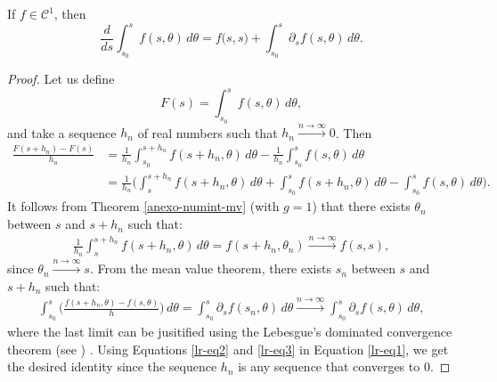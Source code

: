 \begin{thrm}
	\label{anexo-numint-lr}
   If $f \in \mathcal{C}^1$, then
	\begin{equation*}
	\frac{d}{ds}\int_{s_0}^{s}f(s,\theta) \,d\theta =
   f\big(s, s\big)+
	\int_{s_0}^{s}\partial_s f(s,\theta) \,d\theta.
	\end{equation*}
\end{thrm}
\begin{proof}
Let us define
\begin{equation*}
F(s) = \int_{s_0}^{s}f(s,\theta) \,d\theta,
\end{equation*}
and take a sequence $h_n$ of real numbers such that  \( h_n \overset{n \to \infty}{\longrightarrow} 0 \).
Then
\begin{align}
\frac{F(s+h_n)-F(s)}{h_n} &= 
\frac{1}{h_n} \int_{s_0}^{s+h_n}f(s+h_n,\theta) \,d\theta - 
\frac{1}{h_n} \int_{s_0}^{s}f(s,\theta) \,d\theta \\ \label{lr-eq1}
&= \frac{1}{h_n} \bigg(
 \int_{s}^{s+h_n}f(s+h_n,\theta) \,d\theta 
+\int_{s_0}^{s}f(s+h_n,\theta) \,d\theta 
-\int_{s_0}^{s}f(s,\theta) \,d\theta \bigg).
\end{align}
It follows from Theorem \ref{anexo-numint-mv} (with $g=1$) that there exists $\theta_n$ between $s$ and $s+h_n$ such that:
\begin{align}\label{lr-eq2}
\frac{1}{h_n} \int_{s}^{s+h_n}f(s+h_n,\theta) \,d\theta  =
f(s+h_n,\theta_n) \overset{n \to \infty}{\longrightarrow} f(s,s),
\end{align}
since \( \theta_n \overset{n \to \infty}{\longrightarrow} s \).
From the mean value theorem,  there exists $s_n$ between $s$ and $s+h_n$ such that:
\begin{align}\label{lr-eq3}
\int_{s_0}^{s} \bigg(\frac{f(s+h_n,\theta) -f(s,\theta)}{h}\bigg) \,d\theta =
\int_{s_0}^{s} \partial_s f(s_n,\theta) \,d\theta 
\overset{n \to \infty}{\longrightarrow}
\int_{s_0}^{s} \partial_s f(s,\theta) \,d\theta,
\end{align}
where the last limit can be jusitified using the Lebesgue's dominated convergence theorem (see \citet[\pno~54]{folland:1999}) .
Using Equations \eqref{lr-eq2} and \eqref{lr-eq3} in Equation \eqref{lr-eq1}, we get the desired identity since
the sequence $h_n$ is any sequence that converges to 0.
\end{proof}
